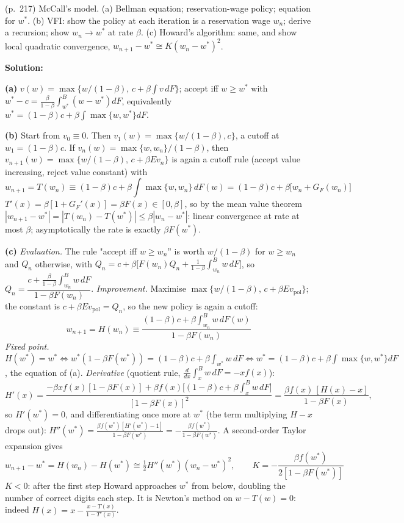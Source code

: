 \documentclass[12pt, letterpaper]{article}
\begin{document}
\begin{tcolorbox}[oddbox,title={Exercise 6.19 \quad Value Function Iteration and Policy Improvement}]
\begin{tcolorbox}[questionbox]
(p.~217) McCall's model. (a) Bellman equation; reservation-wage policy; equation for $w^*$. (b) VFI: show the
policy at each iteration is a reservation wage $w_n$; derive a recursion; show $w_n\to w^*$ at rate $\beta$.
(c) Howard's algorithm: same, and show local quadratic convergence, $w_{n+1}-w^*\cong K(w_n-w^*)^2$.
\end{tcolorbox}

\textbf{Solution:}

\textbf{(a)} $v(w)=\max\{w/(1-\beta),\,c+\beta\int v\,dF\}$; accept iff $w\ge w^*$ with
$w^*-c=\frac{\beta}{1-\beta}\int_{w^*}^B(w-w^*)dF$, equivalently $w^*=(1-\beta)c+\beta\int\max\{w,w^*\}dF$.

\textbf{(b)} Start from $v_0\equiv0$. Then $v_1(w)=\max\{w/(1-\beta),c\}$, a cutoff at $w_1=(1-\beta)c$. If
$v_n(w)=\max\{w,w_n\}/(1-\beta)$, then $v_{n+1}(w)=\max\{w/(1-\beta),\,c+\beta Ev_n\}$ is again a cutoff rule (accept value
increasing, reject value constant) with
\[
\boxed{w_{n+1}=T(w_n)\equiv(1-\beta)c+\beta\int\max\{w,w_n\}\,dF(w)=(1-\beta)c+\beta\big[w_n+G_F(w_n)\big]}
\]
$T'(x)=\beta[1+G_F'(x)]=\beta F(x)\in[0,\beta]$, so by the mean value theorem
$|w_{n+1}-w^*|=|T(w_n)-T(w^*)|\le\beta|w_n-w^*|$: linear convergence at rate at most $\beta$; asymptotically the
rate is exactly $\beta F(w^*)$.

\textbf{(c)} \emph{Evaluation.} The rule "accept iff $w\ge w_n$'' is worth $w/(1-\beta)$ for $w\ge w_n$ and $Q_n$
otherwise, with $Q_n=c+\beta\big[F(w_n)Q_n+\frac{1}{1-\beta}\int_{w_n}^Bw\,dF\big]$, so
$Q_n=\dfrac{c+\frac{\beta}{1-\beta}\int_{w_n}^Bw\,dF}{1-\beta F(w_n)}$.
\emph{Improvement.} Maximise $\max\{w/(1-\beta),\,c+\beta Ev_{\text{pol}}\}$; the constant is $c+\beta Ev_{\text{pol}}=Q_n$, so the new
policy is again a cutoff:
\[
\boxed{w_{n+1}=H(w_n)\equiv\frac{(1-\beta)c+\beta\int_{w_n}^Bw\,dF(w)}{1-\beta F(w_n)}}
\]
\emph{Fixed point.} $H(w^*)=w^*\iff w^*(1-\beta F(w^*))=(1-\beta)c+\beta\int_{w^*}w\,dF\iff w^*=(1-\beta)c+\beta\int\max\{w,w^*\}dF$,
the equation of (a).
\emph{Derivative} (quotient rule, $\frac{d}{dx}\int_x^Bw\,dF=-xf(x)$):
\[
H'(x)=\frac{-\beta xf(x)[1-\beta F(x)]+\beta f(x)\big[(1-\beta)c+\beta\int_x^Bw\,dF\big]}{[1-\beta F(x)]^2}=\frac{\beta f(x)\,[H(x)-x]}{1-\beta F(x)},
\]
so $H'(w^*)=0$, and differentiating once more at $w^*$ (the term multiplying $H-x$ drops out):
$H''(w^*)=\frac{\beta f(w^*)[H'(w^*)-1]}{1-\beta F(w^*)}=-\frac{\beta f(w^*)}{1-\beta F(w^*)}$. A second-order Taylor expansion gives
\[
w_{n+1}-w^*=H(w_n)-H(w^*)\cong\tfrac12H''(w^*)(w_n-w^*)^2,\qquad
\boxed{K=-\frac{\beta f(w^*)}{2[1-\beta F(w^*)]}}
\]
$K<0$: after the first step Howard approaches $w^*$ from below, doubling the number of correct digits each
step. It is Newton's method on $w-T(w)=0$: indeed $H(x)=x-\frac{x-T(x)}{1-T'(x)}$.


\end{tcolorbox}
\end{document}
